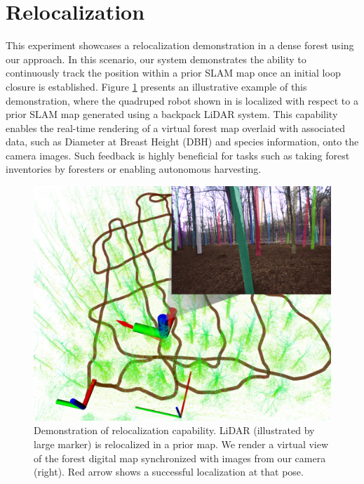 \section{Relocalization} 
\label{sec:exp_relocalization}
This experiment showcases a relocalization demonstration in a dense forest using our approach. In this scenario, our system demonstrates the ability to continuously track the position within a prior SLAM map once an initial loop closure is established.
Figure \ref{fig:relocalization} presents an illustrative example of this demonstration, where the quadruped robot shown in  is localized with respect to a prior SLAM map generated using a backpack LiDAR system. This capability enables the real-time rendering of a virtual forest map overlaid with associated data, such as Diameter at Breast Height (DBH) and species information, onto the camera images. Such feedback is highly beneficial for tasks such as taking forest inventories by foresters or enabling autonomous harvesting.
\begin{figure}[htbp]
  \centering
  \includegraphics[width=0.99\linewidth]{pics/exp_4_relocalization_demo.png}
  \caption{Demonstration of relocalization capability. LiDAR (illustrated by large marker) is relocalized in a prior map. We render a virtual view of the forest digital map synchronized with images from our camera (right). Red arrow shows a successful localization at that pose.}
  \label{fig:relocalization}
\end{figure}

